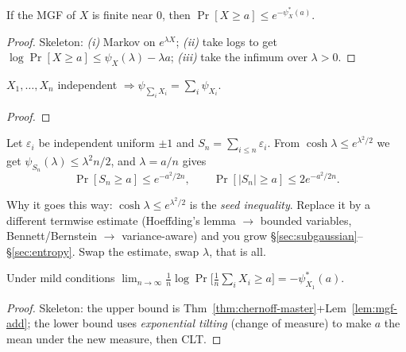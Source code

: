 
\begin{theorem}\label{thm:chernoff-master}
If the MGF of $X$ is finite near $0$, then $\displaystyle \Pr[X\ge a]\le e^{-\psi_X^*(a)}$.
\end{theorem}
\begin{proof}
Skeleton: \emph{(i)} Markov on $e^{\lambda X}$; \emph{(ii)} take logs to get $\log\Pr[X\ge a]\le \psi_X(\lambda)-\lambda a$;
\emph{(iii)} take the infimum over $\lambda>0$. 
\end{proof}

\begin{lemma}\label{lem:mgf-add}
$X_1,\dots,X_n$ independent $\Rightarrow \psi_{\sum_i X_i}=\sum_i \psi_{X_i}$.
\end{lemma}
\begin{proof}\end{proof}

\begin{example}\label{ex:rademacher}
Let $\varepsilon_i$ be independent uniform $\pm1$ and $S_n=\sum_{i\le n}\varepsilon_i$. From
$\cosh\lambda\le e^{\lambda^2/2}$ we get $\psi_{S_n}(\lambda)\le \lambda^2 n/2$, and $\lambda=a/n$ gives
\[
  \Pr[S_n\ge a]\le e^{-a^2/2n},\qquad \Pr[|S_n|\ge a]\le 2e^{-a^2/2n}.
\]
\end{example}

\begin{strand}
Why it goes this way: $\cosh\lambda\le e^{\lambda^2/2}$ is the \emph{seed inequality}. Replace it by a
different termwise estimate (Hoeffding's lemma $\to$ bounded variables, Bennett/Bernstein
$\to$ variance-aware) and you grow §\ref{sec:subgaussian}–§\ref{sec:entropy}. Swap the estimate, swap $\lambda$, that is all.
\end{strand}

\begin{theorem}\label{thm:cramer}
Under mild conditions $\displaystyle \lim_{n\to\infty}\tfrac1n\log\Pr\!\big[\tfrac1n\textstyle\sum_i X_i\ge a\big]=-\psi_{X_1}^*(a)$.
\end{theorem}
\begin{proof}
Skeleton: the upper bound is Thm~\ref{thm:chernoff-master}+Lem~\ref{lem:mgf-add}; the lower bound uses
\emph{exponential tilting} (change of measure) to make $a$ the mean under the new measure, then CLT.
\end{proof}

